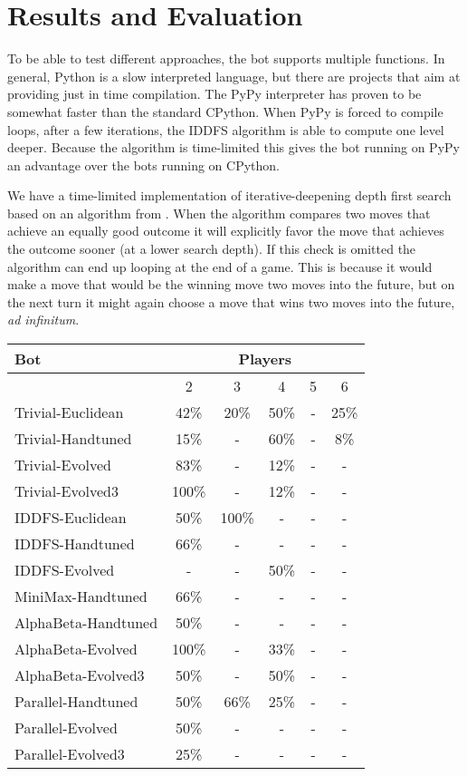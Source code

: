 \section{Results and Evaluation}

To be able to test different approaches, the bot supports multiple
functions. In general, Python is a slow interpreted language, but
there are projects that aim at providing just in time compilation. The
PyPy interpreter has proven to be somewhat faster than the standard
CPython. When PyPy is forced to compile loops, after a few iterations,
the IDDFS algorithm is able to compute one level deeper. Because the
algorithm is time-limited this gives the bot running on PyPy an
advantage over the bots running on CPython.

We have a time-limited implementation of iterative-deepening depth
first search based on an algorithm from \cite{aimodern}. When the
algorithm compares two moves that achieve an equally good outcome it
will explicitly favor the move that achieves the outcome sooner (at a
lower search depth). If this check is omitted the algorithm can end up
looping at the end of a game. This is because it would make a move
that would be the winning move two moves into the future, but on the
next turn it might again choose a move that wins two moves into the
future, \emph{ad infinitum}.

\begin{tabular}{ | l | c | c | c | c | c | }
\hline
Bot & \multicolumn{5}{|c|}{Players} \\
\hline
& 2 & 3 & 4 & 5 & 6 \\
\hline
Trivial-Euclidean & 42\% & 20\% & 50\% & - & 25\% \\
\hline
Trivial-Handtuned & 15\% & - & 60\% & - & 8\% \\
\hline
Trivial-Evolved & 83\% & - & 12\% & - & - \\
\hline
Trivial-Evolved3 & 100\% & - & 12\% & - & - \\
\hline
IDDFS-Euclidean & 50\% & 100\% & - & - & - \\
\hline
IDDFS-Handtuned & 66\% & - & - & - & - \\
\hline
IDDFS-Evolved & - & - & 50\% & - & - \\
\hline
MiniMax-Handtuned & 66\% & - & - & - & - \\
\hline
AlphaBeta-Handtuned & 50\% & - & - & - & - \\
\hline
AlphaBeta-Evolved & 100\% & - & 33\% & - & - \\
\hline
AlphaBeta-Evolved3 & 50\% & - & 50\% & - & - \\
\hline
Parallel-Handtuned & 50\% & 66\% & 25\% & - & - \\
\hline
Parallel-Evolved & 50\% & - & - & - & - \\
\hline
Parallel-Evolved3 & 25\% & - & - & - & - \\
\hline
\end{tabular}



